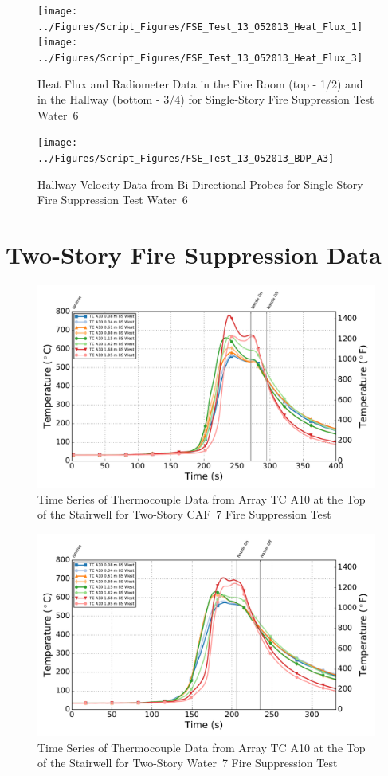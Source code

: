 \documentclass[12pt,oneside]{book}
\begin{document}
\begin{figure}[ht]
\texttt{[image: ../Figures/Script\_Figures/FSE\_Test\_13\_052013\_Heat\_Flux\_1]}
\texttt{[image: ../Figures/Script\_Figures/FSE\_Test\_13\_052013\_Heat\_Flux\_3]}
\caption{Heat Flux and Radiometer Data in the Fire Room (top - 1/2) and in the Hallway (bottom - 3/4) for Single-Story Fire Suppression Test Water~6}
\end{figure}

\clearpage

\begin{figure}[ht]
\texttt{[image: ../Figures/Script\_Figures/FSE\_Test\_13\_052013\_BDP\_A3]}
\caption{Hallway Velocity Data from Bi-Directional Probes for Single-Story Fire Suppression Test Water~6}
\end{figure}
\newpage

\chapter{Two-Story Fire Suppression Data}
\label{app:fire_suppression2}

\begin{figure}[!ht]
	\includegraphics[width=.85\columnwidth]{../Figures/Script_Figures/Test_38_West_061315_TC_A10}
	\caption{Time Series of Thermocouple Data from Array TC A10 at the Top of the Stairwell for Two-Story CAF~7 Fire Suppression Test}
	\label{fig:app_caf7_tca10}
\end{figure}
\clearpage

\begin{figure}[!ht]
	\includegraphics[width=.85\columnwidth]{../Figures/Script_Figures/Test_39_West_061315_TC_A10}
	\caption{Time Series of Thermocouple Data from Array TC A10 at the Top of the Stairwell for Two-Story Water~7 Fire Suppression Test}
	\label{fig:app_water7_tca10}
\end{figure}
\end{document}
